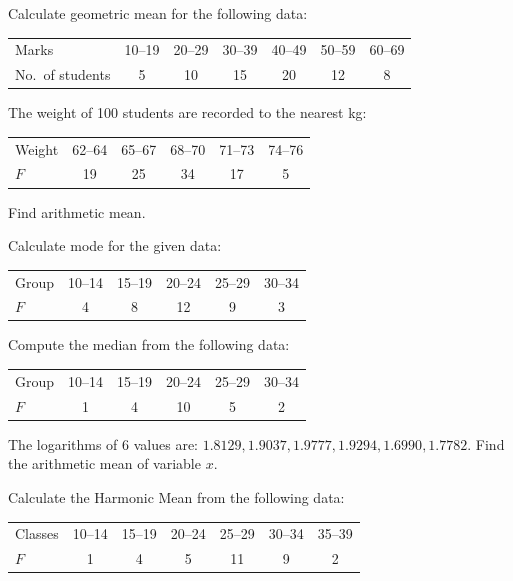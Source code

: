 \documentclass[11pt,a4paper]{article}
\begin{document}
\begin{longlist}
\item Calculate geometric mean for the following data:
\begin{center}
\begin{tabular}{l|cccccc}
Marks & 10--19 & 20--29 & 30--39 & 40--49 & 50--59 & 60--69 \\
No.\ of students & 5 & 10 & 15 & 20 & 12 & 8
\end{tabular}
\end{center}

\item The weight of 100 students are recorded to the nearest kg:
\begin{center}
\begin{tabular}{l|ccccc}
Weight & 62--64 & 65--67 & 68--70 & 71--73 & 74--76 \\
$F$ & 19 & 25 & 34 & 17 & 5
\end{tabular}
\end{center}
Find arithmetic mean.

\item Calculate mode for the given data:
\begin{center}
\begin{tabular}{l|ccccc}
Group & 10--14 & 15--19 & 20--24 & 25--29 & 30--34 \\
$F$ & 4 & 8 & 12 & 9 & 3
\end{tabular}
\end{center}

\item Compute the median from the following data:
\begin{center}
\begin{tabular}{l|ccccc}
Group & 10--14 & 15--19 & 20--24 & 25--29 & 30--34 \\
$F$ & 1 & 4 & 10 & 5 & 2
\end{tabular}
\end{center}

\item The logarithms of 6 values are: $1.8129, 1.9037, 1.9777, 1.9294, 1.6990, 1.7782$. Find the arithmetic mean of variable $x$.

\item Calculate the Harmonic Mean from the following data:
\begin{center}
\begin{tabular}{l|cccccc}
Classes & 10--14 & 15--19 & 20--24 & 25--29 & 30--34 & 35--39 \\
$F$ & 1 & 4 & 5 & 11 & 9 & 2
\end{tabular}
\end{center}


\end{longlist}
\end{document}

